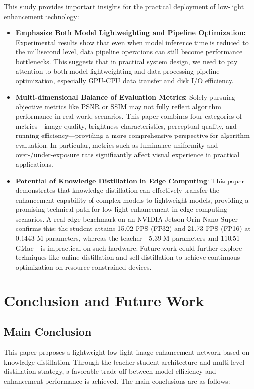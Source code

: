 \documentclass[sensors,article,submit,moreauthors]{Definitions/mdpi}
\begin{document}
This study provides important insights for the practical deployment of low-light enhancement technology:

\begin{itemize}
\item \textbf{Emphasize Both Model Lightweighting and Pipeline Optimization:} Experimental results show that even when model inference time is reduced to the millisecond level, data pipeline operations can still become performance bottlenecks. This suggests that in practical system design, we need to pay attention to both model lightweighting and data processing pipeline optimization, especially GPU-CPU data transfer and disk I/O efficiency.
\item \textbf{Multi-dimensional Balance of Evaluation Metrics:} Solely pursuing objective metrics like PSNR or SSIM may not fully reflect algorithm performance in real-world scenarios. This paper combines four categories of metrics---image quality, brightness characteristics, perceptual quality, and running efficiency---providing a more comprehensive perspective for algorithm evaluation. In particular, metrics such as luminance uniformity and over-/under-exposure rate significantly affect visual experience in practical applications.
\item \textbf{Potential of Knowledge Distillation in Edge Computing:} This paper demonstrates that knowledge distillation can effectively transfer the enhancement capability of complex models to lightweight models, providing a promising technical path for low-light enhancement in edge computing scenarios. A real-edge benchmark on an NVIDIA Jetson Orin Nano Super confirms this: the student attains 15.02 FPS (FP32) and 21.73 FPS (FP16) at 0.1443 M parameters, whereas the teacher---5.39 M parameters and 110.51 GMac---is impractical on such hardware. Future work could further explore techniques like online distillation and self-distillation to achieve continuous optimization on resource-constrained devices.
\end{itemize}

\section{Conclusion and Future Work}

\subsection{Main Conclusion}

This paper proposes a lightweight low-light image enhancement network based on knowledge distillation. Through the teacher-student architecture and multi-level distillation strategy, a favorable trade-off between model efficiency and enhancement performance is achieved. The main conclusions are as follows:
\end{document}
